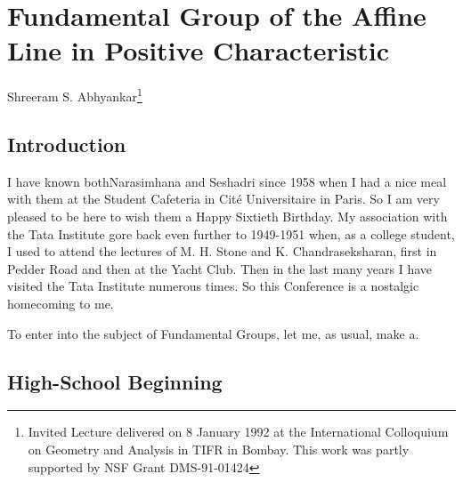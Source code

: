 \chapter{Fundamental Group of the Affine Line in Positive Characteristic}\label{chap1}

\begin{center}
Shreeram S. Abhyankar\footnote{Invited Lecture delivered on 8 January 1992 at the International Colloquium on Geometry and Analysis in TIFR in Bombay. This work was partly supported by NSF Grant DMS-91-01424}
\end{center}


\section{Introduction}\label{chap1-sec1}

I have known both\pageoriginale Narasimhana and Seshadri since 1958 when I had a nice meal with them at the Student Cafeteria in Cit\'e Universitaire in Paris. So I am very pleased to be here to wish them a Happy Sixtieth Birthday. My association with the Tata Institute gore back even further to 1949-1951 when, as a college student, I used to attend the lectures of M. H. Stone and K. Chandraseksharan, first in Pedder Road and then at the Yacht Club. Then in the last many years I have visited the Tata Institute numerous times. So this Conference is a nostalgic homecoming to me.     

To enter into the subject of Fundamental Groups, let me, as usual, make a.

\section{High-School Beginning}\label{chap1-sec2}

